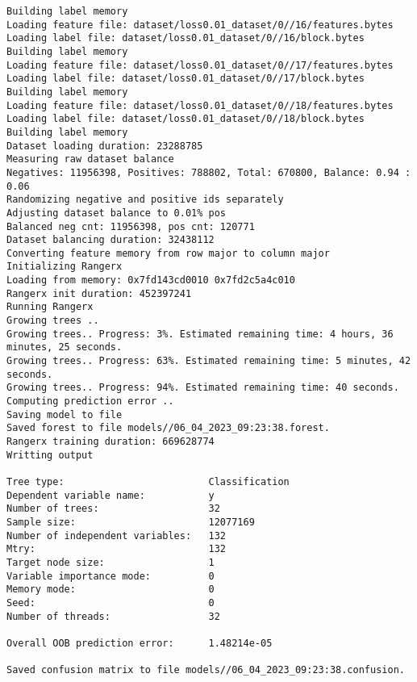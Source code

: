 \documentclass[12pt,oneside]{book}
\begin{document}
\begin{lstlisting}
Building label memory
Loading feature file: dataset/loss0.01_dataset/0//16/features.bytes
Loading label file: dataset/loss0.01_dataset/0//16/block.bytes
Building label memory
Loading feature file: dataset/loss0.01_dataset/0//17/features.bytes
Loading label file: dataset/loss0.01_dataset/0//17/block.bytes
Building label memory
Loading feature file: dataset/loss0.01_dataset/0//18/features.bytes
Loading label file: dataset/loss0.01_dataset/0//18/block.bytes
Building label memory
Dataset loading duration: 23288785
Measuring raw dataset balance
Negatives: 11956398, Positives: 788802, Total: 670800, Balance: 0.94 : 0.06
Randomizing negative and positive ids separately
Adjusting dataset balance to 0.01% pos
Balanced neg cnt: 11956398, pos cnt: 120771
Dataset balancing duration: 32438112
Converting feature memory from row major to column major
Initializing Rangerx
Loading from memory: 0x7fd143cd0010 0x7fd2c5a4c010
Rangerx init duration: 452397241
Running Rangerx
Growing trees ..
Growing trees.. Progress: 3%. Estimated remaining time: 4 hours, 36 minutes, 25 seconds.
Growing trees.. Progress: 63%. Estimated remaining time: 5 minutes, 42 seconds.
Growing trees.. Progress: 94%. Estimated remaining time: 40 seconds.
Computing prediction error ..
Saving model to file
Saved forest to file models//06_04_2023_09:23:38.forest.
Rangerx training duration: 669628774
Writting output

Tree type:                         Classification
Dependent variable name:           y
Number of trees:                   32
Sample size:                       12077169
Number of independent variables:   132
Mtry:                              132
Target node size:                  1
Variable importance mode:          0
Memory mode:                       0
Seed:                              0
Number of threads:                 32

Overall OOB prediction error:      1.48214e-05

Saved confusion matrix to file models//06_04_2023_09:23:38.confusion.
\end{lstlisting}
\end{document}
